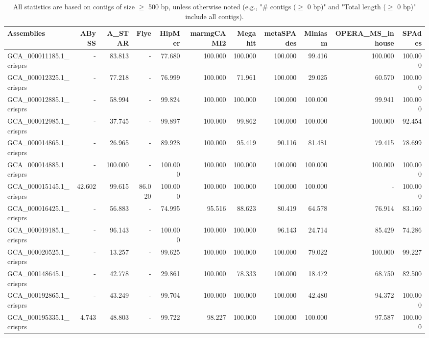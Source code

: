 \documentclass[12pt,a4paper]{article}
\begin{document}
\begin{table}[ht]
\begin{center}
\caption{All statistics are based on contigs of size $\geq$ 500 bp, unless otherwise noted (e.g., "\# contigs ($\geq$ 0 bp)" and "Total length ($\geq$ 0 bp)" include all contigs).}
\begin{tabular}{|l*{10}{|r}|}
\hline
Assemblies & ABySS & A\_STAR & Flye & HipMer & marmgCAMI2 & Megahit & metaSPAdes & Miniasm & OPERA\_MS\_inhouse & SPAdes \\ \hline
GCA\_000011185.1\_crisprs & - & 83.813 & - & 77.680 & 100.000 & 100.000 & 100.000 & 99.416 & 100.000 & 100.000 \\ \hline
GCA\_000012325.1\_crisprs & - & 77.218 & - & 76.999 & 100.000 & 71.961 & 100.000 & 29.025 & 60.570 & 100.000 \\ \hline
GCA\_000012885.1\_crisprs & - & 58.994 & - & 99.824 & 100.000 & 100.000 & 100.000 & 100.000 & 99.941 & 100.000 \\ \hline
GCA\_000012985.1\_crisprs & - & 37.745 & - & 99.897 & 100.000 & 99.862 & 100.000 & 100.000 & 100.000 & 92.454 \\ \hline
GCA\_000014865.1\_crisprs & - & 26.965 & - & 89.928 & 100.000 & 95.419 & 90.116 & 81.481 & 79.415 & 78.699 \\ \hline
GCA\_000014885.1\_crisprs & - & 100.000 & - & 100.000 & 100.000 & 100.000 & 100.000 & 100.000 & 100.000 & 100.000 \\ \hline
GCA\_000015145.1\_crisprs & 42.602 & 99.615 & 86.020 & 100.000 & 100.000 & 100.000 & 100.000 & 100.000 & - & 100.000 \\ \hline
GCA\_000016425.1\_crisprs & - & 56.883 & - & 74.995 & 95.516 & 88.623 & 80.419 & 64.578 & 76.914 & 83.160 \\ \hline
GCA\_000019185.1\_crisprs & - & 96.143 & - & 100.000 & 100.000 & 100.000 & 96.143 & 24.714 & 85.429 & 74.286 \\ \hline
GCA\_000020525.1\_crisprs & - & 13.257 & - & 99.625 & 100.000 & 100.000 & 100.000 & 79.022 & 100.000 & 99.227 \\ \hline
GCA\_000148645.1\_crisprs & - & 42.778 & - & 29.861 & 100.000 & 78.333 & 100.000 & 18.472 & 68.750 & 82.500 \\ \hline
GCA\_000192865.1\_crisprs & - & 43.249 & - & 99.704 & 100.000 & 100.000 & 100.000 & 42.480 & 94.372 & 100.000 \\ \hline
GCA\_000195335.1\_crisprs & 4.743 & 48.803 & - & 99.722 & 98.227 & 100.000 & 100.000 & 100.000 & 97.587 & 100.000 \\ \hline

\end{tabular}
\end{center}
\end{table}
\end{document}
